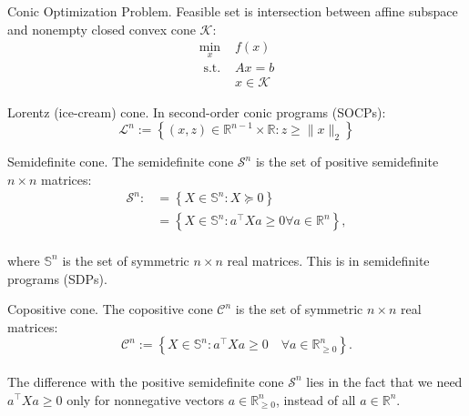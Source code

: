 
\begin{remark}[L9.1]{Conic Optimization Problem.}
    Feasible set is intersection between affine subspace and nonempty closed convex cone $\mathcal{K}$:
    \vspace{-4pt}\\
    \begin{equation}
        \begin{array}{cl}
        \min _x & f(x) \\
        \text { s.t. } & A x=b \\
        & x \in \mathcal{K}
        \end{array}\tag{2}
    \end{equation}
    \vspace{-4pt}
\end{remark}


\begin{definition}[L9.1]{Lorentz (ice-cream) cone.}
    In second-order conic programs (SOCPs):
    \vspace{-4pt}\\
    $$
    \mathcal{L}^n:=\left\{(x, z) \in \mathbb{R}^{n-1} \times \mathbb{R}: z \geq\|x\|_2\right\}
    $$
    \vspace{-4pt}
\end{definition}

\begin{definition}[L9.2]{Semidefinite cone.}
    The semidefinite cone $\mathcal{S}^n$ is the set of positive semidefinite $n \times n$ matrices:
    \vspace{-4pt}\\
    $$
    \begin{aligned}
        \mathcal{S}^n :&=\left\{X \in \mathbb{S}^n: X \succeq 0\right\}\\
        &=\left\{X \in \mathbb{S}^n: a^{\top} X a \geq 0 \forall a \in \mathbb{R}^n\right\},
    \end{aligned}
    $$
    \vspace{-4pt}\\
    where $\mathbb{S}^n$ is the set of symmetric $n \times n$ real matrices. This is in semidefinite programs (SDPs).
\end{definition}

\begin{definition}[L9.3]{Copositive cone.}
    The copositive cone $\mathcal{C}^n$ is the set of symmetric $n \times n$ real matrices:
    \vspace{-4pt}\\
    $$
    \mathcal{C}^n:=\left\{X \in \mathbb{S}^n: a^{\top} X a \geq 0 \quad \forall a \in \mathbb{R}_{\geq 0}^n\right\} .
    $$
    \vspace{-4pt}\\
    The difference with the positive semidefinite cone $\mathcal{S}^n$ lies in the fact that we need $a^{\top} X a \geq 0$ only for nonnegative vectors $a \in \mathbb{R}_{\geq 0}^n$, instead of all $a \in \mathbb{R}^n$.
\end{definition}

